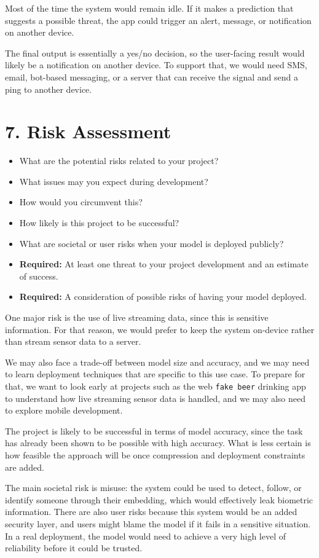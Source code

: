 \documentclass[11pt]{article}
\begin{document}
Most of the time the system would remain idle. If it makes a prediction that suggests a possible threat, the app could trigger an alert, message, or notification on another device.

The final output is essentially a yes/no decision, so the user-facing result would likely be a notification on another device. To support that, we would need SMS, email, bot-based messaging, or a server that can receive the signal and send a ping to another device.

\section{7. Risk Assessment}
\begin{itemize}
    \item What are the potential risks related to your project?
    \item What issues may you expect during development?
    \item How would you circumvent this?
    \item How likely is this project to be successful?
    \item What are societal or user risks when your model is deployed publicly?
    \item \textbf{Required:} At least one threat to your project development and an estimate of success.
    \item \textbf{Required:} A consideration of possible risks of having your model deployed.
\end{itemize}

One major risk is the use of live streaming data, since this is sensitive information. For that reason, we would prefer to keep the system on-device rather than stream sensor data to a server.

We may also face a trade-off between model size and accuracy, and we may need to learn deployment techniques that are specific to this use case. To prepare for that, we want to look early at projects such as the web \texttt{fake beer} drinking app to understand how live streaming sensor data is handled, and we may also need to explore mobile development.

The project is likely to be successful in terms of model accuracy, since the task has already been shown to be possible with high accuracy. What is less certain is how feasible the approach will be once compression and deployment constraints are added.

The main societal risk is misuse: the system could be used to detect, follow, or identify someone through their embedding, which would effectively leak biometric information. There are also user risks because this system would be an added security layer, and users might blame the model if it fails in a sensitive situation. In a real deployment, the model would need to achieve a very high level of reliability before it could be trusted.
\end{document}
